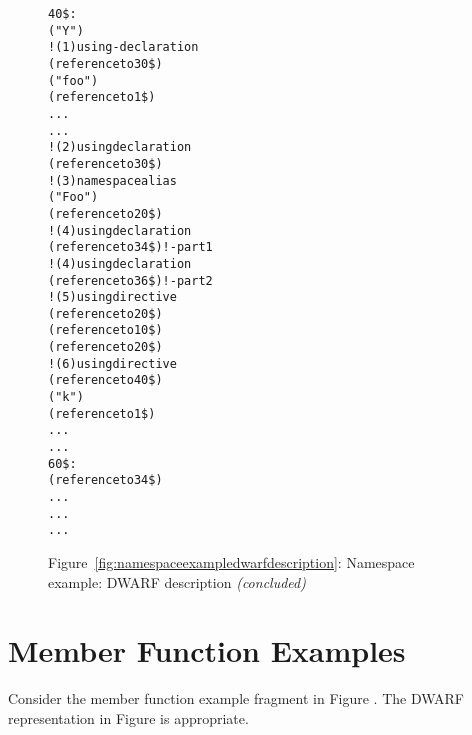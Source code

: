 \begin{figure}
\begin{dwflisting}
\begin{alltt}
40\$: \DWTAGnamespace
        \DWATname("Y")
        \DWTAGimporteddeclaration            ! (1) using-declaration
            \DWATimport(reference to 30\$)
        \DWTAGvariable
            \DWATname("foo")
            \DWATtype(reference to 1\$)
            \DWATlocation ...
            ...
     \DWTAGimporteddeclaration               ! (2) using declaration
        \DWATimport(reference to 30\$)
        \DWTAGimporteddeclaration            ! (3) namespace alias
            \DWATname("Foo")
            \DWATimport(reference to 20\$)
        \DWTAGimporteddeclaration            ! (4) using declaration
            \DWATimport(reference to 34\$)     !     - part 1
        \DWTAGimporteddeclaration            ! (4) using declaration
            \DWATimport(reference to 36\$)     !     - part 2
        \DWTAGimportedmodule                 ! (5) using directive
            \DWATimport(reference to 20\$)
        \DWTAGnamespace
            \DWATextension(reference to 10\$)
            \DWTAGnamespace
                \DWATextension(reference to 20\$)
                \DWTAGimportedmodule         ! (6) using directive
                    \DWATimport(reference to 40\$)
                \DWTAGvariable
                    \DWATname("k")
                    \DWATtype(reference to 1\$)
                    \DWATlocation ...
                    ...
60\$: \DWTAGsubprogram
        \DWATspecification(reference to 34\$)
        \DWATlowpc ...
        \DWAThighpc ...
        ...
\end{alltt}
\end{dwflisting}
\begin{center}
Figure~\ref{fig:namespaceexampledwarfdescription}: Namespace example: DWARF description \textit{(concluded)}
\end{center}
\end{figure}

\clearpage
\section{Member Function Examples}
\label{app:memberfunctionexample}
Consider the member function example fragment in 
Figure .
The DWARF representation in 
Figure 
is appropriate.

